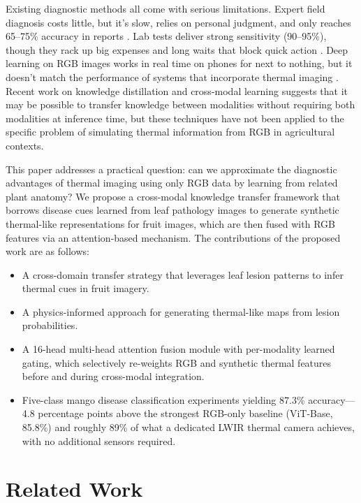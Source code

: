 \documentclass[utf8]{FrontiersinHarvard} %
\begin{document}
Existing diagnostic methods all come with serious limitations. Expert field diagnosis costs little, but it's slow, relies on personal judgment, and only reaches 65–75\% accuracy in reports \cite{ferentinos2018}. Lab tests deliver strong sensitivity (90–95\%), though they rack up big expenses and long waits that block quick action \cite{martinelli2015}. Deep learning on RGB images works in real time on phones for next to nothing, but it doesn't match the performance of systems that incorporate thermal imaging \cite{mohanty2016,hasan2024}. Recent work on knowledge distillation \cite{hinton2015,li2023_kd} and cross-modal learning \cite{xu2023} suggests that it may be possible to transfer knowledge between modalities without requiring both modalities at inference time, but these techniques have not been applied to the specific problem of simulating thermal information from RGB in agricultural contexts.

This paper addresses a practical question: can we approximate the diagnostic advantages of thermal imaging using only RGB data by learning from related plant anatomy? We propose a cross-modal knowledge transfer framework that borrows disease cues learned from leaf pathology images to generate synthetic thermal-like representations for fruit images, which are then fused with RGB features via an attention-based mechanism. The contributions of the proposed work are as follows:

\begin{itemize}
    \item A cross-domain transfer strategy that leverages leaf lesion patterns to infer thermal cues in fruit imagery.
    \item A physics-informed approach for generating thermal-like maps from lesion probabilities.
    
    \item A 16-head multi-head attention fusion module with per-modality learned gating, which selectively re-weights RGB and synthetic thermal features before and during cross-modal integration.
    
    \item Five-class mango disease classification experiments yielding 87.3\% accuracy---4.8 percentage points above the strongest RGB-only baseline (ViT-Base, 85.8\%) and roughly 89\% of what a dedicated LWIR thermal camera achieves, with no additional sensors required.
\end{itemize}


\section{Related Work}
\end{document}
